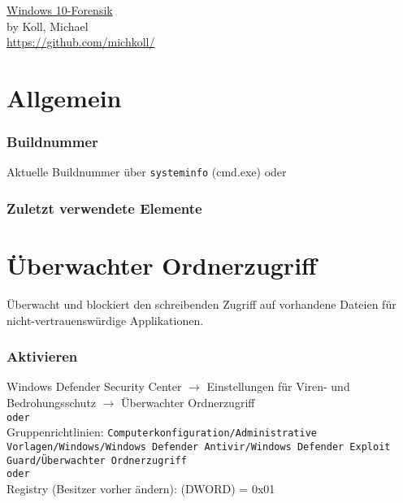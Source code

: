 \raggedright
\footnotesize
\begin{multicols}{3}	
	\setlength{\premulticols}{1pt}
	\setlength{\postmulticols}{1pt}
	\setlength{\multicolsep}{1pt}
	\setlength{\columnsep}{2pt}

\begin{center}
     \Large{\underline{Windows 10-Forensik}} \\
     \small by Koll, Michael \\
     \url{https://github.com/michkoll/}
\end{center}

\section{Allgemein}

\subsubsection{Buildnummer}
Aktuelle Buildnummer über \texttt{systeminfo} (cmd.exe) oder 

\subsubsection{Zuletzt verwendete Elemente}

\section{Überwachter Ordnerzugriff}
Überwacht und blockiert den schreibenden Zugriff auf vorhandene Dateien für nicht-vertrauenswürdige Applikationen.


\subsubsection{Aktivieren}
Windows Defender Security Center $\rightarrow$ Einstellungen für Viren- und Bedrohungsschutz $\rightarrow$ Überwachter Ordnerzugriff\\
\texttt{oder}\\
Gruppenrichtlinien: \texttt{Computerkonfiguration/Administrative Vorlagen/Windows/Windows Defender Antivir/Windows Defender Exploit Guard/Überwachter Ordnerzugriff}\\
\texttt{oder}\\
Registry (Besitzer vorher ändern):  (DWORD) = 0x01


\end{multicols}
